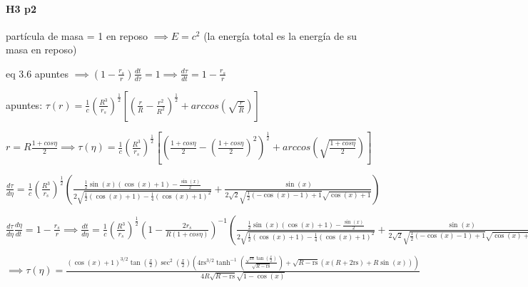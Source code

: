 \documentclass[10pt]{book}
\begin{document}
\paragraph{H3 p2}

partícula de masa = 1 en reposo $\implies E = c^2$  (la energía total es la energía de su masa en reposo)

eq 3.6 apuntes $\implies (1-\frac{r_s}{r}) \frac{dt}{d\tau} = 1 \implies \frac{d\tau}{dt} = 1-\frac{r_s}{r}  $

apuntes: $\tau(r) = \frac{1}{c} (\frac{R^3}{r_s})^{\frac{1}{2}} [(\frac{r}{R} -\frac{r^2}{R^2})^{\frac{1}{2}} + arccos(\sqrt{\frac{r}{R}}) ] $

$r = R \frac{1+cos \eta}{2} \implies \tau(\eta) = \frac{1}{c} (\frac{R^3}{r_s})^{\frac{1}{2}} [(\frac{1+cos \eta}{2} -(\frac{1+cos \eta}{2}) ^2)^{\frac{1}{2}} + arccos(\sqrt{\frac{1+cos \eta}{2}}) ] $

$\frac{d\tau}{d\eta} =  \frac{1}{c} (\frac{R^3}{r_s})^{\frac{1}{2}} ( \frac{\frac{1}{2} \sin (x) (\cos (x)+1)-\frac{\sin (x)}{2}}{2 \sqrt{\frac{1}{2} (\cos (x)+1)-\frac{1}{4} (\cos (x)+1)^2}} + \frac{\sin (x)}{2 \sqrt{2} \sqrt{\frac{1}{2} (-\cos (x)-1)+1} \sqrt{\cos (x)+1}} )$

$\frac{d\tau}{d\eta} \frac{d\eta}{dt} = 1-\frac{r_s}{r} \implies \frac{dt}{d\eta} =  \frac{1}{c} (\frac{R^3}{r_s})^{\frac{1}{2}} (1-\frac{2 r_s}{R(1+cos \eta)})^{-1} ( \frac{\frac{1}{2} \sin (x) (\cos (x)+1)-\frac{\sin (x)}{2}}{2 \sqrt{\frac{1}{2} (\cos (x)+1)-\frac{1}{4} (\cos (x)+1)^2}} + \frac{\sin (x)}{2 \sqrt{2} \sqrt{\frac{1}{2} (-\cos (x)-1)+1} \sqrt{\cos (x)+1}} ) $

$\implies \tau(\eta) = \frac{(\cos (x)+1)^{3/2} \tan \left(\frac{x}{2}\right) \sec ^2\left(\frac{x}{2}\right) \left(4 \text{rs}^{3/2} \tanh ^{-1}\left(\frac{\sqrt{\text{rs}} \tan \left(\frac{x}{2}\right)}{\sqrt{R-\text{rs}}}\right)+\sqrt{R-\text{rs}} (x (R+2 \text{rs})+R \sin (x))\right)}{4 R \sqrt{R-\text{rs}} \sqrt{1-\cos (x)}}$
\end{document}
